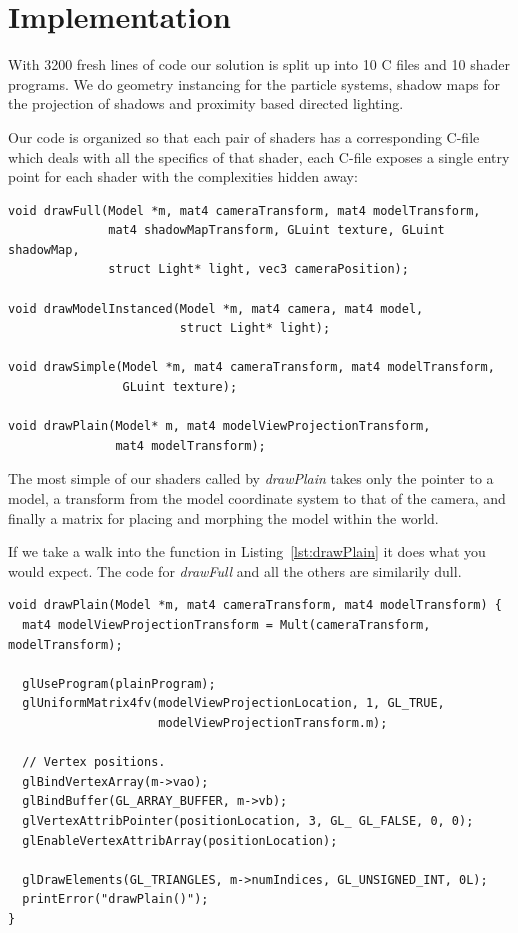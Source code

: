 \documentclass[a4paper,12pt]{article}
\begin{document}
\section{Implementation}

With 3200 fresh lines of code our solution is split up into 10 C files and 10 shader programs. We do geometry instancing for the particle systems, shadow maps for the projection of shadows and proximity based directed lighting.

Our code is organized so that each pair of shaders has a corresponding C-file which deals with all the specifics of that shader, each C-file exposes a single entry point for each shader with the complexities hidden away:

\begin{lstlisting}[label=lst:entry-points,caption= The entry points of each shader pair\, listed in decreasing complexity.]
void drawFull(Model *m, mat4 cameraTransform, mat4 modelTransform,
              mat4 shadowMapTransform, GLuint texture, GLuint shadowMap,
              struct Light* light, vec3 cameraPosition);

void drawModelInstanced(Model *m, mat4 camera, mat4 model,
                        struct Light* light);

void drawSimple(Model *m, mat4 cameraTransform, mat4 modelTransform,
                GLuint texture);

void drawPlain(Model* m, mat4 modelViewProjectionTransform,
               mat4 modelTransform);
\end{lstlisting}

The most simple of our shaders called by \emph{drawPlain} takes only the pointer to a model, a transform from the model coordinate system to that of the camera, and finally a matrix for placing and morphing the model within the world.

If we take a walk into the function in Listing~\ref{lst:drawPlain} it does what you would expect. The code for \emph{drawFull} and all the others are similarily dull.

\begin{lstlisting}[label=lst:drawPlain,caption= The contents of the drawPlain function.]
void drawPlain(Model *m, mat4 cameraTransform, mat4 modelTransform) {
  mat4 modelViewProjectionTransform = Mult(cameraTransform, modelTransform);

  glUseProgram(plainProgram);
  glUniformMatrix4fv(modelViewProjectionLocation, 1, GL_TRUE,
                     modelViewProjectionTransform.m);

  // Vertex positions.
  glBindVertexArray(m->vao);
  glBindBuffer(GL_ARRAY_BUFFER, m->vb);
  glVertexAttribPointer(positionLocation, 3, GL_ GL_FALSE, 0, 0);
  glEnableVertexAttribArray(positionLocation);

  glDrawElements(GL_TRIANGLES, m->numIndices, GL_UNSIGNED_INT, 0L);
  printError("drawPlain()");
}
\end{lstlisting}
\end{document}
